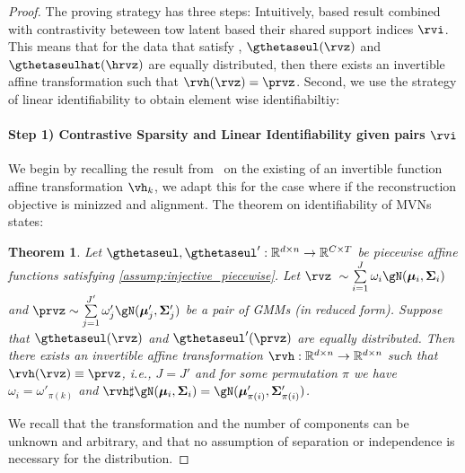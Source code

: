 \documentclass{article} %
\theoremstyle{plain}
\newtheorem{theorem}{Theorem}[section]
\theoremstyle{definition}
\theoremstyle{remark}
\numberwithin{equation}{section}
\begin{document}
\propositionpiecewiselinearsupportindex*

\begin{proof}
The proving strategy has three steps: Intuitively, based result \citep{kivva2022identifiability} combined with contrastivity beteween tow latent based their shared support indices $\rvi$. This means that for the data that satisfy , $\gthetaseul(\rvz)$ and $\gthetaseulhat(\hrvz)$ are equally distributed, then there exists an invertible affine transformation such that $\rvh(\rvz)=\prvz$. 
Second, we use the strategy of linear identifiability \citep{lachapelle2022partial} to obtain element wise identifiabiltiy:

\paragraph{{{\bf Step }\textcolor{crefcolor}{1)}} Contrastive Sparsity and Linear Identifiability given pairs $\rvi$}\label{proof:step1} We begin by recalling the result from~\citet{kivva2022identifiability} on the existing of an invertible function affine transformation $\vh_{k}$, we adapt this for the case where if the reconstruction objective is minizzed and alignment. The theorem on identifiability of MVNs states:

    
    \begin{theorem}\label{thm:main:npmixF2}
    Let $\gthetaseul, \gthetaseul^{\prime}:\mathbb{R}^{d\times n} \rightarrow \mathbb{R}^{C\times T}$ be piecewise affine functions satisfying \ref{assump:injective_piecewise}. Let $\rvz~\sim \sum\limits_{i=1}^{J} \omega_i\gN(\boldsymbol\mu_i, \boldsymbol\Sigma_i)$ and $\prvz \sim \sum\limits_{j=1}^{J'} \omega_j'\gN(\boldsymbol\mu_j', \boldsymbol\Sigma_j')$ be a pair of GMMs (in reduced form). Suppose that $\gthetaseul(\rvz)$ and $\gthetaseul^{\prime}(\prvz)$ are equally distributed. Then there exists an invertible affine transformation $\rvh:\mathbb{R}^{d\times n} \rightarrow \mathbb{R}^{d\times n}$ such that $\rvh(\rvz) \equiv \prvz$, i.e., $J = J'$ and for some permutation $\pi$ we have $\omega_i = \omega'_{\pi(k)}$ and $\rvh\sharp\gN(\boldsymbol\mu_i, \boldsymbol\Sigma_i) = \gN(\boldsymbol\mu'_{\pi(i)}, \boldsymbol\Sigma'_{\pi(i)})$.
    \end{theorem}
    
    We recall that the transformation and the number of components can be unknown and arbitrary, and that no assumption of separation or independence is necessary for the distribution.\par
    

\end{proof}
\end{document}
